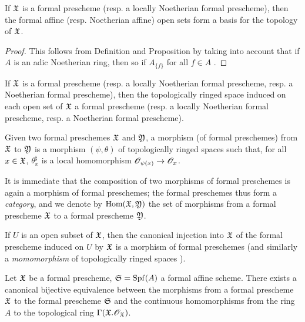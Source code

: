 \begin{prop}[10.4.3]
\label{1.10.4.3}
If $\mathfrak{X}$ is a formal prescheme (resp. a locally Noetherian formal prescheme), then the formal affine (resp. Noetherian affine) open sets form a basis for the topology of $\mathfrak{X}$.
\end{prop}

\begin{proof}
\label{proof-1.10.4.3}
This follows from Definition  and Proposition  by taking into account that if $A$ is an adic Noetherian ring, then so if $A_{\{f\}}$ for all $f\in A$ .
\end{proof}

\begin{cor}[10.4.4]
\label{1.10.4.4}
If $\mathfrak{X}$ is a formal prescheme (resp. a locally Noetherian formal prescheme, resp. a Noetherian formal prescheme), then the topologically ringed space induced on each open set of $\mathfrak{X}$ a formal prescheme (resp. a locally Noetherian formal prescheme, resp. a Noetherian formal prescheme).
\end{cor}

\begin{defn}[10.4.5]
\label{1.10.4.5}
Given two formal preschemes $\mathfrak{X}$ and $\mathfrak{Y}$, a morphism (of formal preschemes) from $\mathfrak{X}$ to $\mathfrak{Y}$ is a morphism $(\psi,\theta)$ of topologically ringed spaces such that, for all $x\in\mathfrak{X}$, $\theta_x^\sharp$ is a local homomorphism $\OO_{\psi(x)}\to\OO_x$.
\end{defn}

It is immediate that the composition of two morphisms of formal preschemes is again a morphism of formal preschemes; the formal preschemes thus form a \emph{category}, and we denote by ${\mathop{\mathrm{Hom}}\nolimits}(\mathfrak{X},\mathfrak{Y})$ the set of morphisms from a formal prescheme $\mathfrak{X}$ to a formal prescheme $\mathfrak{Y}$.

If $U$ is an open subset of $\mathfrak{X}$, then the canonical injection into $\mathfrak{X}$ of the formal prescheme induced on $U$ by $\mathfrak{X}$ is a morphism of formal preschemes (and similarly a \emph{momomorphism} of topologically ringed spaces ).

\begin{prop}[10.4.6]
\label{1.10.4.6}
Let $\mathfrak{X}$ be a formal prescheme, $\mathfrak{S}={\mathop{\mathrm{Spf}}\nolimits}(A)$ a formal affine scheme.
There exists a canonical bijective equivalence between the morphisms from a formal prescheme $\mathfrak{X}$ to the formal prescheme $\mathfrak{S}$ and the continuous homomorphisms from the ring $A$ to the topological ring $\Gamma(\mathfrak{X}.\mathscr{O}_\mathfrak{X})$.
\end{prop}

